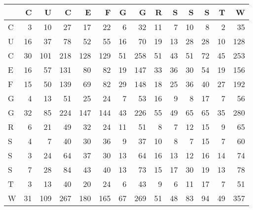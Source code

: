 \begin{tabular}{lrrrrrrrrrrrrr}
\toprule
{} &   C &    U &    C &    E &    F &   G &    G &   R &   S &   S &   S &   T &    W \\
\midrule
C &   3 &   10 &   27 &   17 &   22 &   6 &   32 &  11 &   7 &  10 &   8 &   2 &   35 \\
U &  16 &   37 &   78 &   52 &   55 &  16 &   70 &  19 &  13 &  28 &  28 &  10 &  128 \\
C &  30 &  101 &  218 &  128 &  129 &  51 &  258 &  51 &  43 &  51 &  72 &  45 &  253 \\
E &  16 &   57 &  131 &   80 &   82 &  19 &  147 &  33 &  36 &  30 &  54 &  19 &  156 \\
F &  15 &   50 &  139 &   69 &   82 &  29 &  148 &  18 &  25 &  36 &  40 &  27 &  192 \\
G &   4 &   13 &   51 &   25 &   24 &   7 &   53 &  16 &   9 &   8 &  17 &   7 &   56 \\
G &  32 &   85 &  224 &  147 &  144 &  43 &  226 &  55 &  49 &  65 &  65 &  35 &  280 \\
R &   6 &   21 &   49 &   32 &   24 &  11 &   51 &   8 &   7 &  12 &  15 &   9 &   65 \\
S &   4 &    7 &   40 &   30 &   36 &   9 &   37 &  10 &   8 &   7 &  15 &   7 &   60 \\
S &   3 &   24 &   64 &   37 &   30 &  13 &   64 &  16 &  13 &  12 &  16 &  14 &   74 \\
S &   7 &   28 &   84 &   43 &   40 &  13 &   73 &  15 &  17 &  30 &  19 &  13 &   78 \\
T &   3 &   13 &   40 &   20 &   24 &   6 &   43 &   9 &   6 &  11 &  17 &   7 &   51 \\
W &  31 &  109 &  267 &  180 &  165 &  67 &  269 &  51 &  48 &  83 &  94 &  49 &  357 \\
\bottomrule
\end{tabular}

